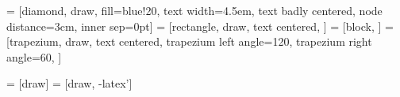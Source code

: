  = [diamond, draw, fill=blue!20, 
    text width=4.5em, text badly centered, node distance=3cm, inner sep=0pt]
 = [rectangle, draw, text centered, ]
 = [block, ]
 = [trapezium, draw, text centered, trapezium left angle=120, trapezium right angle=60, ]

 = [draw]
 = [draw, -latex']




